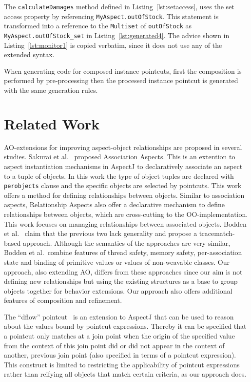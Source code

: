 \documentclass{acm_proc_article-sp}
\begin{document}
The \texttt{calculateDamages} method defined in Listing~\ref{lst:setaccess}, uses the set access property by referencing \texttt{MyAspect.outOfStock}. This statement is transformed into a reference to the \texttt{Multiset} of \texttt{outOfStock} as \texttt{MyAspect.outOfStock_set} in Listing~\ref{lst:generated4}. The advice shown in Listing~\ref{lst:monitor1} is copied verbatim, since it does not use any of the extended syntax.

When generating code for composed instance pointcuts, first the composition is performed by pre-processing then the processed instance pointcut is generated with the same generation rules. 

\section{Related Work}
AO-extensions for improving aspect-object relationships are proposed in several studies. Sakurai et al.~\cite{sakurai2004association} proposed Association Aspects. This is an extention to aspect instantiation mechanisms in AspectJ to declaratively associate an aspect to a tuple of objects. In this work the type of object tuples are declared with \texttt{perobjects} clause and the specific objects are selected by pointcuts. This work offers a method for defining relationships between objects. Similar to association aspects, Relationship Aspects \cite{pearce2006relationship} also offer a declarative mechanism to define relationships between objects, which are cross-cutting to the OO-implementation. This work focuses on managing relationships between associated objects. Bodden et al.~ \cite{bodden2008relational} claim that the previous two lack generality and propose a tracematch-based approach. Although the semantics of the approaches are very similar, Bodden et al.\ combine features of thread safety, memory safety, per-association state and binding of primitive values or values of non-weavable classes. Our approach, also extending AO, differs from these approaches since our aim is not defining new relationships but using the existing structures as a base to group objects together for behavior extensions. Our approach also offers additional features of composition and refinement.

The ``dflow'' pointcut~\cite{kawauchi:aosd-aosdsec04} is an extension to AspectJ that can be used to reason about the values bound by pointcut expressions. Thereby it can be specified that a pointcut only matches at a join point when the origin of the specified value from the context of this join point did or did not appear in the context of another, previous join point (also specified in terms of a pointcut expression). This construct is limited to restricting the applicability of pointcut expressions rather than reifying all objects that match certain criteria, as our approach does.
\end{document}

